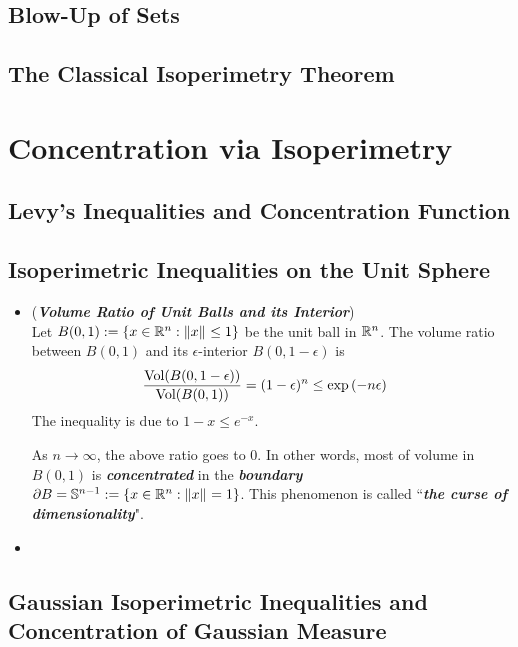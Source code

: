 \documentclass[11pt]{article}
\begin{document}
\subsection{Blow-Up of Sets}
\subsection{The Classical Isoperimetry Theorem}

\section{Concentration via Isoperimetry}
\subsection{Levy's Inequalities and Concentration Function}
\subsection{Isoperimetric Inequalities on the Unit Sphere}
\begin{itemize}
\item \begin{remark} (\emph{\textbf{Volume Ratio of Unit Balls and its Interior}})  \citep{vershynin2018high}\\
Let $B(0, 1):= \left\{x \in {\mathbb R}^n: \left\|x\right\|_{} \le 1\right\}$ be the unit ball in ${\mathbb R}^n$. The volume ratio between $B(0,1)$ and its $\epsilon$-interior $B(0, 1-\epsilon)$ is
\begin{align*}
\frac{\text{Vol}(B(0, 1-\epsilon))}{\text{Vol}(B(0,1))} &= (1 - \epsilon)^n \le \exp\left(-n \epsilon\right)
\end{align*} The inequality is due to $1 - x\le e^{-x}$.  

As $n \to \infty$, the above ratio goes to $0$. In other words, most of volume in $B(0,1)$ is \emph{\textbf{concentrated}} in the \emph{\textbf{boundary}} $\partial B = {\mathbb S}^{n-1} := \left\{x \in {\mathbb R}^n: \left\|x\right\|_{} = 1\right\}$. This phenomenon is called ``\emph{\textbf{the curse of dimensionality}}".
\end{remark}

\item \begin{definition}
\end{definition}
\end{itemize}
\subsection{Gaussian Isoperimetric Inequalities and  Concentration of Gaussian Measure}
\end{document}
